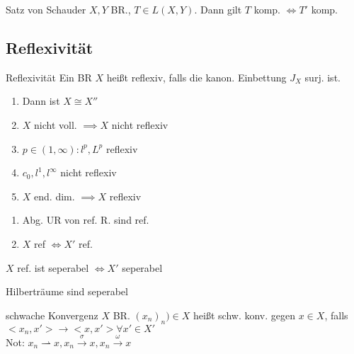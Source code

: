 \begin{satz}{Satz von Schauder}
    \(X,Y\) BR., \(T\in L(X,Y)\). Dann gilt
    \(T\) komp. \(\Leftrightarrow T'\) komp.
\end{satz}


\subsection{Reflexivität}

\begin{definition}{Reflexivität}
    Ein BR \(X\) heißt reflexiv, falls die kanon. Einbettung \(J_X\) surj. ist.
\end{definition}

\begin{bemerkung}
    \begin{enumerate}[label = (\roman*)]
        \item Dann ist \(X\cong X''\)
        \item \(X\) nicht voll. \(\implies X\) nicht reflexiv
        \item \(p\in (1,\infty): l^p, L^p\) reflexiv
        \item \(c_0, l^1, l^\infty\) nicht reflexiv
        \item \(X\) end. dim. \(\implies X\) reflexiv
    \end{enumerate}
\end{bemerkung}

\begin{lemma}
    \begin{enumerate}[label = (\roman*)]
        \item Abg. UR von ref. R. sind ref.
        \item \(X\) ref \(\Leftrightarrow X'\) ref.
    \end{enumerate}
\end{lemma}

\begin{korrolar}
    \(X\) ref. ist seperabel \(\Leftrightarrow X'\) seperabel
\end{korrolar}

\begin{bemerkung}
    Hilberträume sind seperabel
\end{bemerkung}

\begin{definition}{schwache Konvergenz}
    \(X\) BR. \((x_n)_n) \in X\) heißt schw. konv. gegen \(x\in X\), falls
    \(<x_n,x'> \to <x,x'> \forall x'\in X'\)\\
    Not: \(x_n \rightharpoonup x, x_n \stackrel{\sigma}{\to} x,
    x_n \stackrel{\omega}{\to} x\)
\end{definition}

